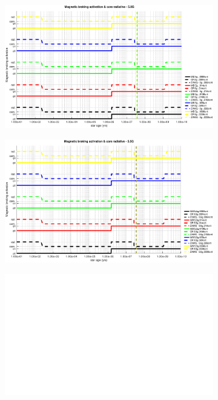 \documentclass[fleqn,usenatbib]{mnras}
\begin{document}
\begin{figure}
\begin{subfigure}[h]{0.47\textwidth}
    \label{fig:subim33}
    \end{subfigure}
    \begin{subfigure}[h]{0.47\textwidth}
    \includegraphics[width=\textwidth]{figures/mb_act_5_0g.eps}
    \label{fig:subim34}
    \end{subfigure}
    \begin{subfigure}[h]{0.47\textwidth}
    \includegraphics[width=\textwidth]{figures/mb_act_5_5g.eps}
    \label{fig:subim35}
    \end{subfigure}
    \begin{subfigure}[h]{0.47\textwidth}
    \includegraphics[width=\textwidth]{figures/blank.eps}

\end{subfigure}
\end{figure}
\end{document}
